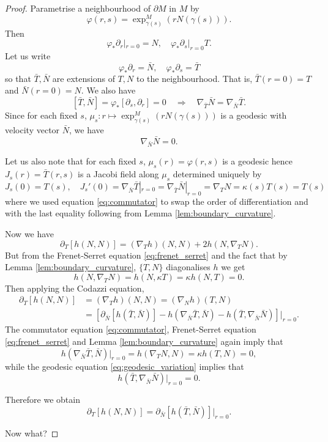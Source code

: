 \documentclass[10pt]{amsart}
\theoremstyle{remark}
\begin{document}
\begin{proof}
Parametrise a neighbourhood of \(\partial M\) in \(M\) by
\[
\varphi(r, s) = \exp^M_{\gamma(s)} (r N(\gamma(s))).
\]
Then
\[
\varphi_{\ast} \partial_r |_{r=0} = N, \quad \varphi_{\ast} \partial_s |_{r=0} T.
\]
Let us write
\[
\varphi_{\ast} \partial_r = \bar{N}, \quad \varphi_{\ast} \partial_s = \bar{T}
\]
so that \(\bar{T}, \bar{N}\) are extensions of \(T, N\) to the neighbourhood. That is, \(\bar{T}(r=0) = T\) and \(\bar{N}(r=0) = N\). We also have
\begin{equation}
\label{eq:commutator}
[\bar{T}, \bar{N}] = \varphi_{\ast} [\partial_s, \partial_r] = 0 \quad \Rightarrow \quad \nabla_{\bar{T}} \bar{N} = \nabla_{\bar{N}} \bar{T}.
\end{equation}
Since for each fixed \(s\), \(\mu_s : r \mapsto \exp^M_{\gamma(s)} (rN(\gamma(s)))\) is a geodesic with velocity vector \(\bar{N}\), we have
\begin{equation}
\label{eq:geodesic_variation}
\nabla_{\bar{N}} \bar{N} = 0.
\end{equation}

Let us also note that for each fixed \(s\), \(\mu_s (r) = \varphi(r, s)\) is a geodesic hence \(J_s (r) = \bar{T}(r, s)\) is a Jacobi field along \(\mu_s\) determined uniquely by
\begin{equation}
\label{eq:jacobi}
J_s(0) = T(s), \quad J_s'(0) = \nabla_{\bar{N}} \bar{T}|_{r=0} = \nabla_{\bar{T}} \bar{N}|_{r=0} = \nabla_T N = \kappa(s) T (s) = T (s)
\end{equation}
where we used equation \eqref{eq:commutator} to swap the order of differentiation and with the last equality following from Lemma \ref{lem:boundary_curvature}.

Now we have
\[
\partial_T [h(N, N)] = (\nabla_T h) (N, N) + 2h(N, \nabla_{T} N).
\]
But from the Frenet-Serret equation \eqref{eq:frenet_serret} and the fact that by Lemma \ref{lem:boundary_curvature}, \(\{T, N\}\) diagonalises \(h\) we get
\[
h(N, \nabla_T N) = h(N, \kappa T) = \kappa h(N, T) = 0.
\]
Then applying the Codazzi equation,
\[
\begin{split}
\partial_T [h(N, N)] &= (\nabla_T h) (N, N) = (\nabla_N h) (T, N) \\
&= \left[\partial_{\bar{N}} [h(\bar{T}, \bar{N})] - h(\nabla_{\bar{N}} \bar{T}, \bar{N}) - h(\bar{T}, \nabla_{\bar{N}} \bar{N})\right]|_{r=0}.
\end{split}
\]
The commutator equation \eqref{eq:commutator}, Frenet-Serret equation \eqref{eq:frenet_serret} and Lemma \ref{lem:boundary_curvature} again imply that
\[
h(\nabla_{\bar{N}} \bar{T}, \bar{N})|_{r=0} = h(\nabla_T N, N) = \kappa h(T, N) = 0,
\]
while the geodesic equation \eqref{eq:geodesic_variation} implies that
\[
h(\bar{T}, \nabla_{\bar{N}} \bar{N})|_{r=0} = 0.
\]

Therefore we obtain
\[
\partial_T [h(N, N)] = \partial_{\bar{N}} [h(\bar{T}, \bar{N})]|_{r=0}.
\]

{\color{red} Now what?}
\end{proof}
\end{document}

